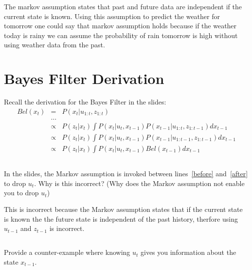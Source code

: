 \documentclass{article}
\begin{document}
The markov assumption states that past and future data are independent if the current state is known.  Using this assumption to predict the weather for tomorrow one could say that markov assumption holds because if the weather today is rainy we can assume the probability of rain tomorrow is high without using weather data from the past.

\newpage

\section{Bayes Filter Derivation}
Recall the derivation for the Bayes Filter in the slides:
\begin{eqnarray}
Bel\left( x_t \right) & = & P\left( x_t | u_{1:t}, z_{1:t} \right) \\
& \ldots & \\
\label{before} & \propto &  P\left( z_t | x_t \right) \int P\left( x_t | u_t, x_{t-1} \right) P\left( x_{t-1} | u_{1:t}, z_{1:t-1} \right) dx_{t-1} \\
\label{after}  & \propto &  P\left( z_t | x_t \right) \int P\left( x_t | u_t, x_{t-1} \right) P\left( x_{t-1} | u_{1:t-1}, z_{1:t-1} \right) dx_{t-1} \\
   & \propto &  P\left( z_t | x_t \right) \int P\left( x_t | u_t, x_{t-1} \right) Bel\left(x_{t-1} \right) dx_{t-1}
\end{eqnarray}

\subsection{}
In the slides, the Markov assumption is invoked between lines~\eqref{before} and~\eqref{after} to drop $u_t$.  Why is this incorrect? (Why does the Markov assumption not enable you to drop $u_t$)
\vspace{5mm}

This is incorrect because the Markov assumption states that if the current state is known the the future state is independent of the past history, therfore using $u_{t-1}$ and $z_{t-1}$ is incorrect.

\subsection{}
Provide a counter-example where knowing $u_t$ gives you information about the state $x_{t-1}$.
\end{document}
